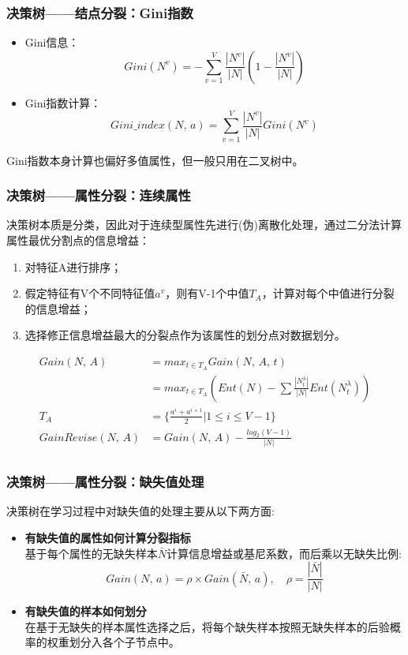 \documentclass[usenames,dvipsnames]{beamer}
\begin{document}
\begin{frame}
\frametitle{决策树——结点分裂：Gini指数}
\begin{itemize}
  \item Gini信息：
      $$Gini(N^v) = - \sum_{v=1}^{V}\frac{|N^v|}{|N|}(1-\frac{|N^v|}{|N|})$$
  \item Gini指数计算：
      $$Gini\_index(N,\,a) = \sum_{v=1}^{V}\frac{|N^v|}{|N|}Gini(N^v)$$
\end{itemize}
Gini指数本身计算也偏好多值属性，但一般只用在二叉树中。
\end{frame}

\begin{frame}
\frametitle{决策树——属性分裂：连续属性}
决策树本质是分类，因此对于连续型属性先进行(伪)离散化处理，通过二分法计算属性最优分割点的信息增益：
\begin{enumerate}
  \item 对特征A进行排序；
  \item 假定特征有V个不同特征值$a^v$，则有V-1个中值$T_A$，计算对每个中值进行分裂的信息增益；
  \item 选择修正信息增益最大的分裂点作为该属性的划分点对数据划分。
\end{enumerate}
    \begin{align*}
            Gain(N,\,A) & = max_{t\in T_A} Gain(N,\,A,\,t)\\
                        & = max_{t\in T_A} (Ent(N) - \sum \frac{|N_t^\lambda|}{|N|}Ent(N_t^\lambda))\\
                    T_A & = \{\frac{a^i+a^{i+1}}{2}|1\le i \le V-1\}\\
      GainRevise(N,\,A) & = Gain(N,\,A) - \frac{log_2(V-1)}{|N|}\\
    \end{align*}
\end{frame}
\begin{frame}
\frametitle{决策树——属性分裂：缺失值处理}
决策树在学习过程中对缺失值的处理主要从以下两方面:
        \begin{itemize}
          \item \textbf{有缺失值的属性如何计算分裂指标}\\
            基于每个属性的无缺失样本$\bar{N}$计算信息增益或基尼系数，而后乘以无缺失比例:
            $$Gain(N,\,a) = \rho \times Gain(\bar{N},\,a),\quad \rho = \frac{|\bar{N}|}{|N|}$$
          \item \textbf{有缺失值的样本如何划分}\\
            在基于无缺失的样本属性选择之后，将每个缺失样本按照无缺失样本的后验概率的权重划分入各个子节点中。
        \end{itemize}
\end{frame}
\end{document}
